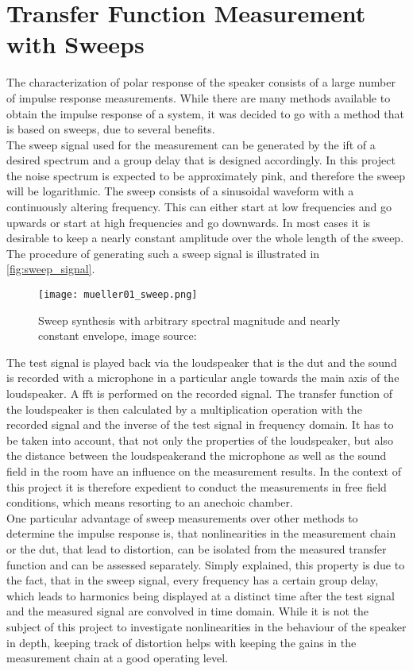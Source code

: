 \section{Transfer Function Measurement with Sweeps}\label{sec:sweep_theorie}
The characterization of polar response of the speaker consists of a large number of impulse response measurements. While there are many methods available to obtain the impulse response of a system, it was decided to go with a method that is based on sweeps, due to several benefits. \citep[p. 3 ff.]{mueller01}\\
The sweep signal used for the measurement can be generated by the \gls{ift} of a desired spectrum and a group delay that is designed accordingly. In this project the noise spectrum is expected to be approximately pink, and therefore the sweep will be logarithmic. The sweep consists of a sinusoidal waveform with a continuously altering frequency. This can either start at low frequencies and go upwards or start at high frequencies and go downwards. In most cases it is desirable to keep a nearly constant amplitude over the whole length of the sweep. The procedure of generating such a sweep signal is illustrated in \autoref{fig:sweep_signal}.

\begin{figure}[htbp]
	\centering
	\texttt{[image: mueller01\_sweep.png]}
	\caption{Sweep synthesis with arbitrary spectral magnitude and nearly constant envelope, image source: \citep{mueller01}}
		\label{fig:sweep_signal}
\end{figure}

The test signal is played back via the loudspeaker that is the \gls{dut} and the sound is recorded with a microphone in a particular angle towards the main axis of the loudspeaker. A \gls{fft} is performed on the recorded signal. The transfer function of the loudspeaker is then calculated by a multiplication operation with the recorded signal and the inverse of the test signal in frequency domain. It has to be taken into account, that not only the properties of the loudspeaker, but also the distance between the loudspeakerand the microphone as well as the sound field in the room have an influence on the measurement results. In the context of this project it is therefore expedient to conduct the measurements in free field conditions, which means resorting to an anechoic chamber.\\
One particular advantage of sweep measurements over other methods to determine the impulse response is, that nonlinearities in the measurement chain or the \gls{dut}, that lead to distortion, can be isolated from the measured transfer function and can be assessed separately. \citep[p. 20 f.]{mueller01} Simply explained, this property is due to the fact, that in the sweep signal, every frequency has a certain group delay, which leads to harmonics being displayed at a distinct time after the test signal and the measured signal are convolved in time domain. While it is not the subject of this project to investigate nonlinearities in the behaviour of the speaker in depth, keeping track of distortion helps with keeping the gains in the measurement chain at a good operating level.

